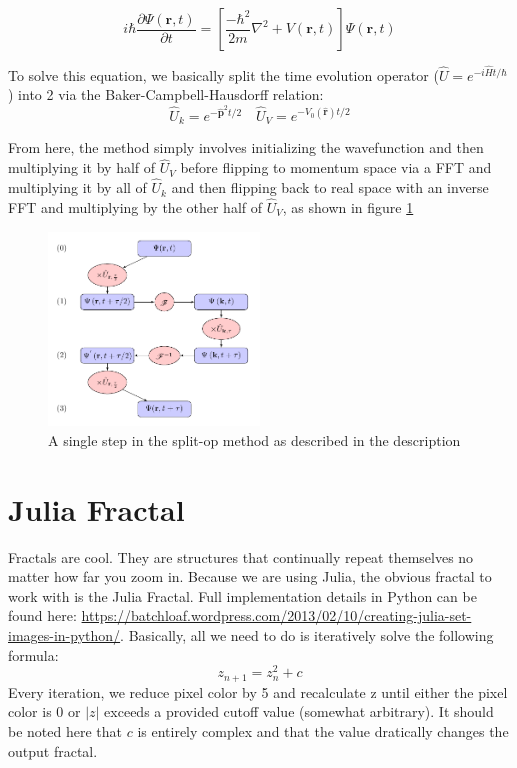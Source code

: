 \documentclass[11pt]{article}
\begin{document}
$$
i \hbar \frac{\partial \Psi(\mathbf{r}, t)}{\partial t} = \left[\frac{-\hbar^2}{2m} \nabla^2 + V(\mathbf{r},t) \right] \Psi(\mathbf{r},t)
$$

To solve this equation, we basically split the time evolution operator ($\hat U = e^{-i \hat H t / \hbar}$) into 2 via the Baker-Campbell-Hausdorff relation:
$$\hat U_k = e^{-\mathbf{\hat p}^2 t / 2} \quad \hat U_V = e^{-V_0(\mathbf{\hat r})t/2}$$

From here, the method simply involves initializing the wavefunction and then multiplying it by half of $\hat U_V$ before flipping to momentum space via a FFT and multiplying it by all of $\hat U_k$ and then flipping back to real space with an inverse FFT and multiplying by the other half of $\hat U_V$, as shown in figure \ref{fig:split-op}

\begin{figure}
\begin{center}
\includegraphics[width = 0.5\textwidth]{split-op.png}
\end{center}
\caption{A single step in the split-op method as described in the description}
\label{fig:split-op}
\end{figure}

\newpage
\section*{Julia Fractal}
Fractals are cool. They are structures that continually repeat themselves no matter how far you zoom in. Because we are using Julia, the obvious fractal to work with is the Julia Fractal. Full implementation details in Python can be found here: \url{https://batchloaf.wordpress.com/2013/02/10/creating-julia-set-images-in-python/}. Basically, all we need to do is iteratively solve the following formula:
$$z_{n+1} = z_n^2 + c$$
Every iteration, we reduce pixel color by 5 and recalculate z until either the pixel color is 0 or $|z|$ exceeds a provided cutoff value (somewhat arbitrary). It should be noted here that $c$ is entirely complex and that the value dratically changes the output fractal.
\end{document}
